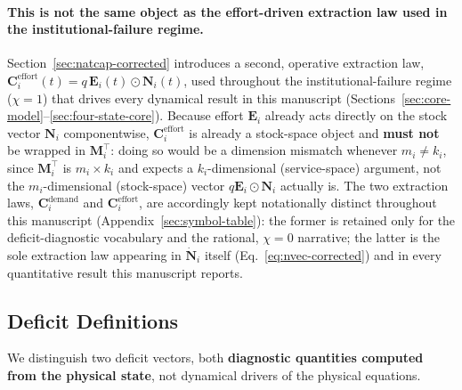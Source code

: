 \documentclass[twocolumn,10pt]{article}
\begin{document}
\paragraph{This is not the same object as the effort-driven extraction law used in the institutional-failure regime.} Section~\ref{sec:natcap-corrected} introduces a second, operative extraction law, $\mathbf{C}_i^{\text{effort}}(t)=q\,\mathbf{E}_i(t)\odot\mathbf{N}_i(t)$, used throughout the institutional-failure regime ($\chi=1$) that drives every dynamical result in this manuscript (Sections~\ref{sec:core-model}--\ref{sec:four-state-core}). Because effort $\mathbf E_i$ already acts directly on the stock vector $\mathbf N_i$ componentwise, $\mathbf C_i^{\text{effort}}$ is already a stock-space object and \textbf{must not} be wrapped in $\mathbf M_i^\top$: doing so would be a dimension mismatch whenever $m_i\neq k_i$, since $\mathbf M_i^\top$ is $m_i\times k_i$ and expects a $k_i$-dimensional (service-space) argument, not the $m_i$-dimensional (stock-space) vector $q\mathbf E_i\odot\mathbf N_i$ actually is. The two extraction laws, $\mathbf C_i^{\text{demand}}$ and $\mathbf C_i^{\text{effort}}$, are accordingly kept notationally distinct throughout this manuscript (Appendix~\ref{sec:symbol-table}): the former is retained only for the deficit-diagnostic vocabulary and the rational, $\chi=0$ narrative; the latter is the sole extraction law appearing in $\dot{\mathbf N}_i$ itself (Eq.~\eqref{eq:nvec-corrected}) and in every quantitative result this manuscript reports.

\subsection{Deficit Definitions}
\label{sec:deficit-definitions}
We distinguish two deficit vectors, both \textbf{diagnostic quantities computed from the physical state}, not dynamical drivers of the physical equations.
\end{document}

